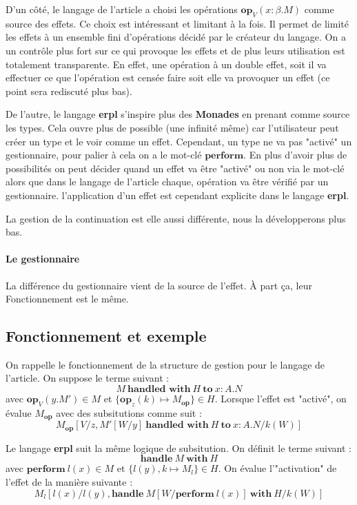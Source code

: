 D'un côté, le langage de l'article a choisi les opérations $\textbf{op}_V(x:\beta.M)$ comme source des effets.
Ce choix est intéressant et limitant à la fois. Il permet de limité les effets à un ensemble fini d'opérations décidé par le créateur du langage. On a un contrôle plus fort sur ce qui provoque les effets et de plus leurs
utilisation est totalement transparente. En effet, une opération à un double effet, soit il va effectuer ce que l'opération
est censée faire soit elle va provoquer un effet (ce point sera rediscuté plus bas).

De l'autre, le langage \textbf{erpl} s'inspire plus des \textbf{Monades} en prenant comme source les types. Cela ouvre
plus de possible (une infinité même) car l'utilisateur peut créer un type et le voir comme un effet. Cependant, un type ne va
pas "activé" un gestionnaire, pour palier à cela on a le mot-clé $\textbf{perform}$. En plus d'avoir plus de possibilités
on peut décider quand un effet va être "activé" ou non via le mot-clé alors que dans le langage de l'article chaque, opération 
va être vérifié par un gestionnaire. l'application d'un effet est cependant explicite dans le langage \textbf{erpl}.

La gestion de la continuation est elle aussi différente, nous la développerons plus bas.

\paragraph{Le gestionnaire} La différence du gestionnaire vient de la source de l'effet. À part ça, leur Fonctionnement
est le même.

\subsection{Fonctionnement et exemple}

On rappelle le fonctionnement de la structure de gestion pour le langage de l'article. On suppose
le terme suivant : 
    \[M~\textbf{handled~with}~H~\textbf{to}~x:A.N\]
avec $\textbf{op}_V(y.M') \in M$ et $\{\textbf{op}_z(k) \mapsto M_\textbf{op}\} \in H$. Lorsque l'effet
est "activé", on évalue $M_\textbf{op}$ avec des subsitutions comme suit : 
    \[M_\textbf{op}[V/z,M'[W/y]~\textbf{handled~with}~H~\textbf{to}~x:A.N/k(W)]\]
\bigbreak

Le langage \textbf{erpl} suit la même logique de subsitution. On définit le terme suivant :
    \[\textbf{handle}~M~\textbf{with}~H\]
avec $\textbf{perform}~l(x) \in M$ et $\{ l(y),k \mapsto M_l\} \in H$. On évalue l'"activation" de l'effet de
la manière suivante : 
    \[M_l[l(x)/l(y),\textbf{handle}~M[W/\textbf{perform}~l(x)]~\textbf{with}~H/k(W)]\]


